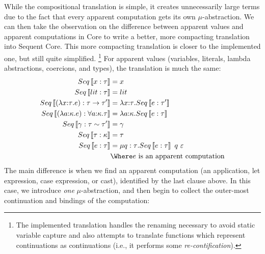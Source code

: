 \documentclass{article}
\begin{document}
While the compositional translation is simple, it creates unnecessarily large
terms due to the fact that every apparent computation gets its own
$\mu$-abstraction.  We can then take the observation on the difference between
apparent values and apparent computations in Core to write a better, more
compacting translation into Sequent Core.  This more compacting translation is
closer to the implemented one, but still quite simplified.%
\footnote{The implemented translation handles the renaming necessary to avoid
  static variable capture and also attempts to translate functions which
  represent continuations as continuations (i.e., it performs some
  \emph{re-contification}).}
For apparent values (variables, literals, lambda abstractions, coercions, and
types), the translation is much the same:
\begin{align*}
  Seq\trans{x : \ty} &= x
  \\
  Seq\trans{\lit : \ty} &= \lit
  \\
  Seq\trans{(\fn{\ann{x}{\ty}} \expr) : \ty \to \ty'}
  &=
  \fn{\ann{x}{\ty}} Seq\trans{\expr : \ty'}
  \\
  Seq\trans{(\fn{\ann{a}{\ki}} \expr) : \forall \ann{a}{\ki}. \ty}
  &=
  \fn{\ann{a}{\ki}} Seq\trans{\expr : \ty}
  \\
  Seq\trans{\cn : \eqty{\ty}{\ty'}} &= \cn
  \\
  Seq\trans{\ty : \ki} &= \ty
  \\
  Seq\trans{\expr : \ty}
  &= \comp{q:\ty} Seq\trans{\expr : \ty} ~ q ~ \mt
  \\
  &
  \Where \expr \text{ is an apparent computation}
\end{align*}
The main difference is when we find an apparent computation (an application, let
expression, case expression, or cast), identified by the last clause above.  In
this case, we introduce \emph{one} $\mu$-abstraction, and then begin to collect
the outer-most continuation and bindings of the computation:
\end{document}
